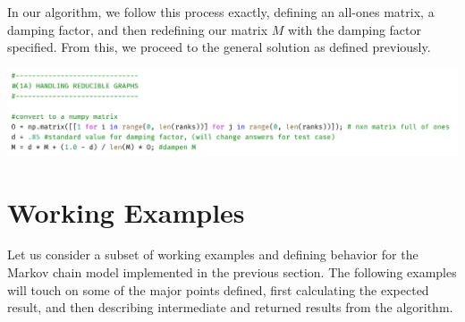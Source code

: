\documentclass{article}
\begin{document}
    \noindent
    In our algorithm, we follow this process exactly, defining an all-ones matrix, a damping factor, and then redefining our matrix $M$ with the damping factor specified. From this, we proceed to the general solution as defined previously.
    \begin{center}
        \includegraphics[scale=.5]{snip1A}
    \end{center}
    
\section{Working Examples}
    Let us consider a subset of working examples and defining behavior for the Markov chain model implemented in the previous section. The following examples will touch on some of the major points defined, first calculating the expected result, and then describing intermediate and returned results from the algorithm.
    
\end{document}
